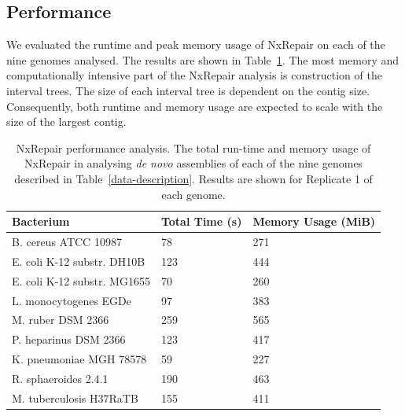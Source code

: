 \subsection{Performance}
We evaluated the runtime and peak memory usage of NxRepair on each of the nine genomes analysed. The results are shown in Table~\ref{tab:performance}. The most memory and computationally intensive part of the NxRepair analysis is construction of the interval trees. The size of each interval tree is dependent on the contig size. Consequently, both runtime and memory usage are expected to scale with the size of the largest contig. 

\begin{table}
\begin{center}
\caption{NxRepair performance analysis. The total run-time and memory usage of NxRepair in analysing \emph{de novo} assemblies of each of the nine genomes described in Table~\ref{data-description}. Results are shown for Replicate 1 of each genome. \label{tab:performance}}
\begin{tabular}{lll}
    \hline
    Bacterium & Total Time (s) & Memory Usage (MiB) \\ \hline
    B. cereus ATCC 10987 & 78 & 271 \\
    E. coli K-12 substr. DH10B & 123 & 444 \\
    E. coli K-12 substr. MG1655 & 70 & 260 \\
    L. monocytogenes EGDe & 97 & 383 \\
    M. ruber DSM 2366 & 259 & 565 \\
    P. heparinus DSM 2366 & 123 & 417 \\
    K. pneumoniae MGH 78578 & 59 & 227 \\
    R. sphaeroides 2.4.1 & 190 & 463 \\
    M. tuberculosis H37RaTB & 155 & 411 \\ 
    \hline
\end{tabular}
\end{center}
\end{table}


